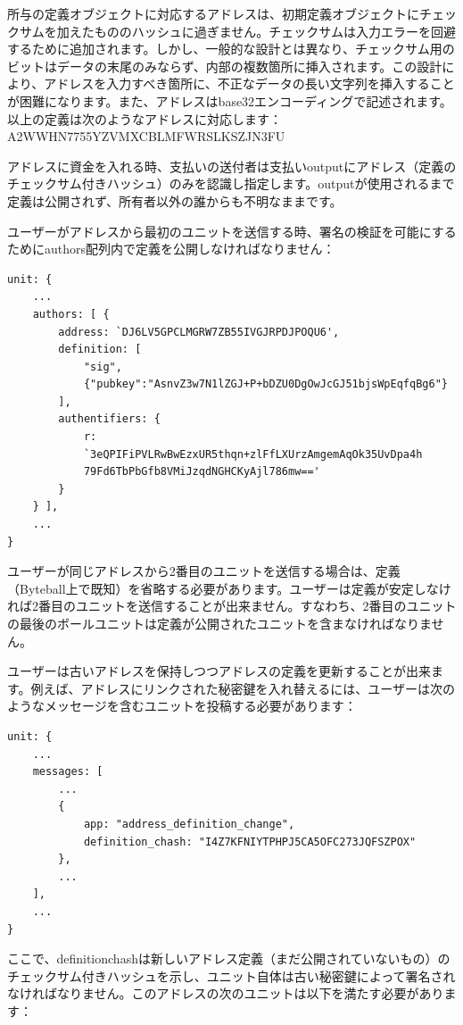 \documentclass[a4paper, dvipdfmx]{jsarticle}
\begin{document}
所与の定義オブジェクトに対応するアドレスは、初期定義オブジェクトにチェックサムを加えたもののハッシュに過ぎません。チェックサムは入力エラーを回避するために追加されます。しかし、一般的な設計とは異なり、チェックサム用のビットはデータの末尾のみならず、内部の複数箇所に挿入されます。この設計により、アドレスを入力すべき箇所に、不正なデータの長い文字列を挿入することが困難になります。また、アドレスはbase32エンコーディングで記述されます。以上の定義は次のようなアドレスに対応します：A2WWHN7755YZVMXCBLMFWRSLKSZJN3FU

アドレスに資金を入れる時、支払いの送付者は支払いoutputにアドレス（定義のチェックサム付きハッシュ）のみを認識し指定します。outputが使用されるまで定義は公開されず、所有者以外の誰からも不明なままです。

ユーザーがアドレスから最初のユニットを送信する時、署名の検証を可能にするためにauthors配列内で定義を公開しなければなりません：

\begin{lstlisting}[basicstyle=\ttfamily\footnotesize, frame=none]
unit: {
    ...
    authors: [ {
        address: `DJ6LV5GPCLMGRW7ZB55IVGJRPDJPOQU6',
        definition: [
            "sig",
            {"pubkey":"AsnvZ3w7N1lZGJ+P+bDZU0DgOwJcGJ51bjsWpEqfqBg6"}
        ],
        authentifiers: {
            r:
            `3eQPIFiPVLRwBwEzxUR5thqn+zlFfLXUrzAmgemAqOk35UvDpa4h
            79Fd6TbPbGfb8VMiJzqdNGHCKyAjl786mw=='
        }
    } ],
    ...
}
\end{lstlisting}

ユーザーが同じアドレスから2番目のユニットを送信する場合は、定義（Byteball上で既知）を省略する必要があります。ユーザーは定義が安定しなければ2番目のユニットを送信することが出来ません。すなわち、2番目のユニットの最後のボールユニットは定義が公開されたユニットを含まなければなりません。

ユーザーは古いアドレスを保持しつつアドレスの定義を更新することが出来ます。例えば、アドレスにリンクされた秘密鍵を入れ替えるには、ユーザーは次のようなメッセージを含むユニットを投稿する必要があります：

\begin{lstlisting}[basicstyle=\ttfamily\footnotesize, frame=none]
unit: {
    ...
    messages: [
        ...
        {
            app: "address_definition_change",
            definition_chash: "I4Z7KFNIYTPHPJ5CA5OFC273JQFSZPOX"
        },
        ...
    ],
    ...
}
\end{lstlisting}

\noindent ここで、definition\textunderscore chashは新しいアドレス定義（まだ公開されていないもの）のチェックサム付きハッシュを示し、ユニット自体は古い秘密鍵によって署名されなければなりません。このアドレスの次のユニットは以下を満たす必要があります：
\end{document}
